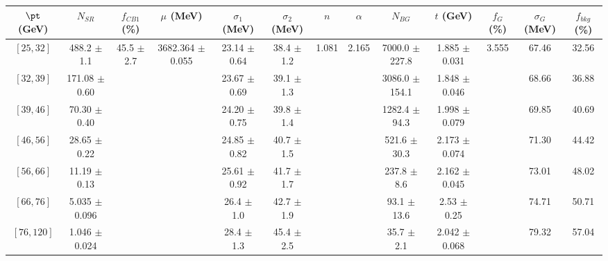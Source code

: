 \begin{tabular}{c||c|c|c|c|c|c|c|c|c|c|c||c}
$\pt$ (GeV) & $N_{SR}$ & $f_{CB1}$ (\%) & $\mu$ (MeV) & $\sigma_1$ (MeV) & $\sigma_2$ (MeV) & $n$ & $\alpha$ & $N_{BG}$ & $t$ (GeV) & $f_G$ (\%) & $\sigma_G$ (MeV) & $f_{bkg}$ (\%) \\
\hline
$[25, 32]$ & 488.2 $\pm$ 1.1 & \multirow{7}{*}{45.5 $\pm$ 2.7} & \multirow{7}{*}{3682.364 $\pm$ 0.055} & 23.14 $\pm$ 0.64 & 38.4 $\pm$ 1.2 & \multirow{7}{*}{1.081} & \multirow{7}{*}{2.165} & 7000.0 $\pm$ 227.8 & 1.885 $\pm$ 0.031 & \multirow{7}{*}{3.555} & 67.46 & 32.56\\
$[32, 39]$ & 171.08 $\pm$ 0.60 &  &  & 23.67 $\pm$ 0.69 & 39.1 $\pm$ 1.3 &  &  & 3086.0 $\pm$ 154.1 & 1.848 $\pm$ 0.046 &  & 68.66 & 36.88\\
$[39, 46]$ & 70.30 $\pm$ 0.40 &  &  & 24.20 $\pm$ 0.75 & 39.8 $\pm$ 1.4 &  &  & 1282.4 $\pm$ 94.3 & 1.998 $\pm$ 0.079 &  & 69.85 & 40.69\\
$[46, 56]$ & 28.65 $\pm$ 0.22 &  &  & 24.85 $\pm$ 0.82 & 40.7 $\pm$ 1.5 &  &  & 521.6 $\pm$ 30.3 & 2.173 $\pm$ 0.074 &  & 71.30 & 44.42\\
$[56, 66]$ & 11.19 $\pm$ 0.13 &  &  & 25.61 $\pm$ 0.92 & 41.7 $\pm$ 1.7 &  &  & 237.8 $\pm$ 8.6 & 2.162 $\pm$ 0.045 &  & 73.01 & 48.02\\
$[66, 76]$ & 5.035 $\pm$ 0.096 &  &  & 26.4 $\pm$ 1.0 & 42.7 $\pm$ 1.9 &  &  & 93.1 $\pm$ 13.6 & 2.53 $\pm$ 0.25 &  & 74.71 & 50.71\\
$[76, 120]$ & 1.046 $\pm$ 0.024 &  &  & 28.4 $\pm$ 1.3 & 45.4 $\pm$ 2.5 &  &  & 35.7 $\pm$ 2.1 & 2.042 $\pm$ 0.068 &  & 79.32 & 57.04\\
\end{tabular}
